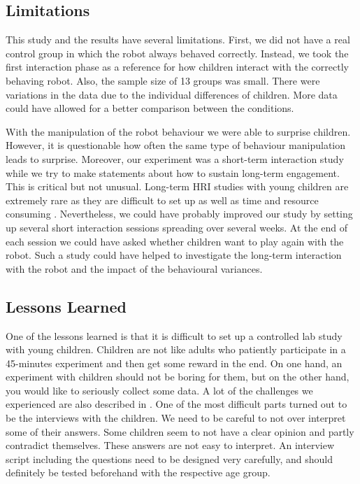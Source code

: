 \documentclass{sig-alternate}
\begin{document}


\subsection{Limitations}

This study and the results have several limitations.  First, we did not have a
real control group in which the robot always behaved correctly. Instead, we took
the first interaction phase as a reference for how children interact with the
correctly behaving robot.  Also, the sample size of 13 groups was small. There
were  variations in the data due to the individual differences of children. More
data could have allowed for a better comparison between the conditions.

With the manipulation of the robot behaviour we were able to surprise children.
However, it is questionable how often the same type of behaviour manipulation
leads to surprise. Moreover, our experiment was a short-term interaction study
while we try to make statements about how to sustain long-term engagement. This
is critical but not unusual. Long-term HRI studies with young children are
extremely rare as they are difficult to set up as well as time and resource
consuming \cite{leite_long-term_2013}. Nevertheless, we could have probably
improved our study by setting up several short interaction sessions spreading
over several weeks. At the end of each session we could have asked whether
children want to play again with the robot. Such a study could have helped to
investigate the long-term interaction with the robot and the impact of the
behavioural variances.

\subsection{Lessons Learned}

One of the lessons learned is that it is difficult to set up a controlled lab
study with young children. Children are not like adults who patiently
participate in a 45-minutes experiment and then get some reward in the end. On
one hand, an experiment with children should not be boring for them, but on the
other hand, you would like to seriously collect some data. A lot of the
challenges we experienced are also described in \cite{ros_child-robot_2011}. One
of the most difficult parts turned out to be the interviews with the children.
We need to be careful to not over interpret some of their answers. Some children
seem to not have a clear opinion and partly contradict themselves. These answers
are not easy to interpret. An interview script including the questions need to
be designed very carefully, and should definitely be tested beforehand with the
respective age group.
\end{document}
